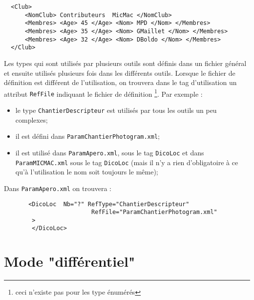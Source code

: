 \begin{verbatim}
  <Club>
      <NomClub> Contributeurs  MicMac </NomClub>
      <Membres> <Age> 45 </Age> <Nom> MPD </Nom> </Membres>
      <Membres> <Age> 35 </Age> <Nom> GMaillet </Nom> </Membres>
      <Membres> <Age> 32 </Age> <Nom> DBoldo </Nom> </Membres>
  </Club>
\end{verbatim}

Les types qui sont utilis\'es par plusieurs outils sont d\'efinis
dans un fichier g\'en\'eral et ensuite utilis\'es plusieurs fois
dans les diff\'erents outils. Lorsque le fichier de d\'efinition est
diff\'erent de l'utilisation, on trouvera dans le tag d'utilisation
un attribut {\tt RefFile} indiquant le fichier de d\'efinition
\footnote{ceci n'existe pas pour les type \'enum\'er\'es}.
Par exemple :


\begin{itemize}
   \item  le type {\tt ChantierDescripteur} est utilis\'es par
          tous les outils un peu complexes;

   \item il est d\'efini dans {\tt ParamChantierPhotogram.xml};
   
    \item il est utilis\'e dans {\tt ParamApero.xml}, sous le tag
          {\tt DicoLoc} et dans {\tt ParamMICMAC.xml} sous le
          tag  {\tt DicoLoc}  (mais il n'y a rien d'obligatoire \`a
          ce qu'\`a l'utilisation le nom soit toujours le m\^eme);

\end{itemize}

Dans  {\tt ParamApero.xml} on trouvera :


\begin{verbatim}
       <DicoLoc  Nb="?" RefType="ChantierDescripteur"
                         RefFile="ParamChantierPhotogram.xml"
        >
        </DicoLoc>

\end{verbatim}




\section{Mode "diff\'erentiel"}

